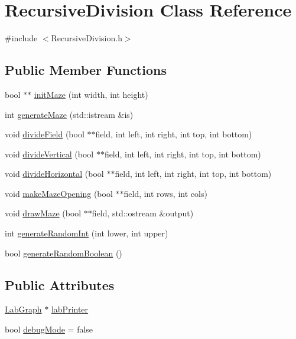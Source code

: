 \hypertarget{class_recursive_division}{\section{Recursive\-Division Class Reference}
\label{class_recursive_division}
}


{\ttfamily \#include $<$Recursive\-Division.\-h$>$}

\subsection*{Public Member Functions}
\begin{DoxyCompactItemize}
\item 
bool $\ast$$\ast$ \hyperlink{class_recursive_division_a3572b23c6eb7d255d1810efe2e40687f}{init\-Maze} (int width, int height)
\item 
int \hyperlink{class_recursive_division_a09758db0100db2aa3902535869ba7d7c}{generate\-Maze} (std\-::istream \&is)
\item 
void \hyperlink{class_recursive_division_a38669e9dcfc8e9056928333613adbaa1}{divide\-Field} (bool $\ast$$\ast$field, int left, int right, int top, int bottom)
\item 
void \hyperlink{class_recursive_division_a16e56a56f3d84644211cff7844c3b4b8}{divide\-Vertical} (bool $\ast$$\ast$field, int left, int right, int top, int bottom)
\item 
void \hyperlink{class_recursive_division_a2d4bb0a2bd69216c35b27e8448e4b1af}{divide\-Horizontal} (bool $\ast$$\ast$field, int left, int right, int top, int bottom)
\item 
void \hyperlink{class_recursive_division_a22f4a67b74499117e6d38cb2de49b9c6}{make\-Maze\-Opening} (bool $\ast$$\ast$field, int rows, int cols)
\item 
void \hyperlink{class_recursive_division_a16d033f98dd8d407d7ccf4828b3391e7}{draw\-Maze} (bool $\ast$$\ast$field, std\-::ostream \&output)
\item 
int \hyperlink{class_recursive_division_aba7306d64093888306f2479fd3e629e6}{generate\-Random\-Int} (int lower, int upper)
\item 
bool \hyperlink{class_recursive_division_a64a45071f78e79f4edd29578d92388e0}{generate\-Random\-Boolean} ()
\end{DoxyCompactItemize}
\subsection*{Public Attributes}
\begin{DoxyCompactItemize}
\item 
\hyperlink{class_lab_graph}{Lab\-Graph} $\ast$ \hyperlink{class_recursive_division_ac2402e5bb64bd4444f584ac6b237f84b}{lab\-Printer}
\item 
bool \hyperlink{class_recursive_division_a3ee7d465c3a8637c37a08de75ced22c1}{debug\-Mode} = false
\end{DoxyCompactItemize}


